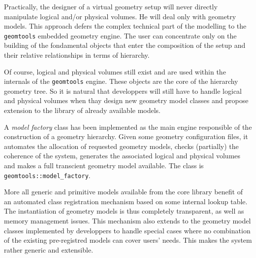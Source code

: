 Practically,  the designer  of  a virtual  geometry  setup will  never
directly manipulate logical and/or physical volumes. He will deal only
with geometry models.  This  approach defers the complex technical
part of the modelling to the \texttt{geomtools} embedded geometry engine.
The user can concentrate only on the building of the fondamental
objects that enter the composition of the setup and their relative 
relationships in terms of hierarchy.

Of  course, logical  and physical  volumes  still exist  and are  used
within the  internals of the \texttt{geomtools}  engine. These objects
are the  core of the  hierarchy geometry tree.  So it is  natural that
developpers  will still have  to handle  logical and  physical volumes
when thay design  new geometry model classes and  propose extension to
the library of already available models.

A \emph{model factory} class has been implemented as the main engine
responsible of the construction of a geometry hierarchy. Given some
geometry configuration files, it automates the allocation of requested 
geometry models, checks (partially) the coherence of the system, generates the 
associated logical and physical volumes and makes a full transcient
geometry model available. The class is \texttt{geomtools::model\_factory}.

More all generic and primitive models available from the core library
benefit of an automated class registration mechanism based on some
internal lookup table. The instantiation
of geometry models is thus completely transparent, as well as memory
management issues. This mechanism also extends to the geometry model classes
implemented by developpers to handle special cases where no
combination of the existing pre-registred models can cover users' needs.
This makes the system rather generic and extensible.


